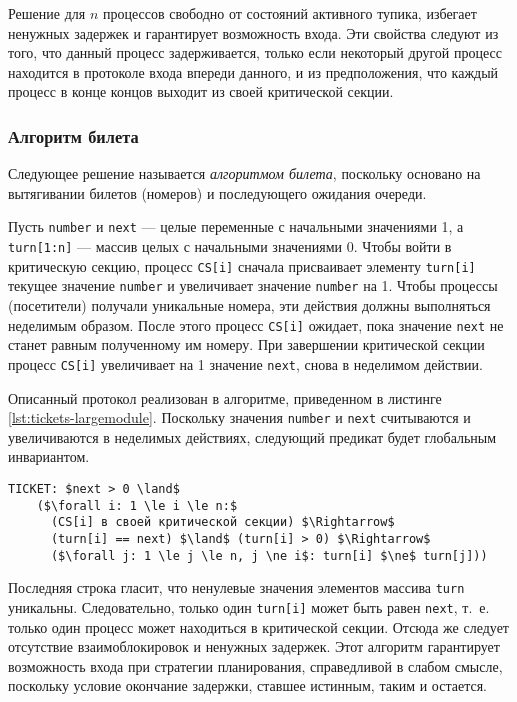 Решение для $n$ процессов свободно от состояний активного тупика, избегает
ненужных задержек и гарантирует возможность входа. Эти свойства следуют из того,
что данный процесс задерживается, только если некоторый другой процесс находится
в протоколе входа впереди данного, и из предположения, что каждый процесс в
конце концов выходит из своей критической секции.


\subsubsection{Алгоритм билета}

Следующее решение называется \emph{алгоритмом билета}, поскольку основано на
вытягивании билетов (номеров) и последующего ожидания очереди.

Пусть \texttt{number} и \texttt{next} --- целые переменные с начальными
значениями 1, а \texttt{turn[1:n]} --- массив целых с начальными значениями
0. Чтобы войти в критическую секцию, процесс \texttt{CS[i]} сначала присваивает
элементу \texttt{turn[i]} текущее значение \texttt{number} и увеличивает
значение \texttt{number} на 1. Чтобы процессы (посетители) получали уникальные
номера, эти действия должны выполняться неделимым образом. После этого процесс
\texttt{CS[i]} ожидает, пока значение \texttt{next} не станет равным полученному
им номеру. При завершении критической секции процесс \texttt{CS[i]} увеличивает
на 1 значение \texttt{next}, снова в неделимом действии.

Описанный протокол реализован в алгоритме, приведенном в листинге
\ref{lst:tickets-largemodule}. Поскольку значения \texttt{number} и
\texttt{next} считываются и увеличиваются в неделимых действиях, следующий
предикат будет глобальным инвариантом.

\lstset{caption=}
\begin{lstlisting}[mathescape]
  TICKET: $next > 0 \land$
    ($\forall i: 1 \le i \le n:$
      (CS[i] в своей критической секции) $\Rightarrow$
      (turn[i] == next) $\land$ (turn[i] > 0) $\Rightarrow$
      ($\forall j: 1 \le j \le n, j \ne i$: turn[i] $\ne$ turn[j]))
\end{lstlisting}

Последняя строка гласит, что ненулевые значения элементов массива \texttt{turn}
уникальны. Следовательно, только один \texttt{turn[i]} может быть равен
\texttt{next}, т.~е. только один процесс может находиться в критической
секции. Отсюда же следует отсутствие взаимоблокировок и ненужных задержек. Этот
алгоритм гарантирует возможность входа при стратегии планирования, справедливой
в слабом смысле, поскольку условие окончание задержки, ставшее истинным, таким и
остается.

